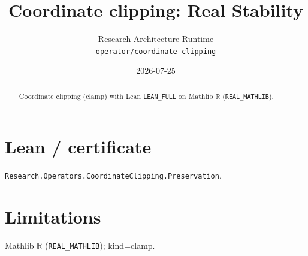 \documentclass[11pt]{article}
\title{Coordinate clipping: Real Stability}
\author{Research Architecture Runtime \\ \texttt{operator/coordinate-clipping}}
\date{2026-07-25}
\begin{document}
\maketitle
\begin{abstract}
Coordinate clipping (clamp) with Lean \texttt{LEAN\_FULL} on Mathlib $\mathbb{R}$ (\texttt{REAL\_MATHLIB}).
\end{abstract}
\section{Lean / certificate}
\texttt{Research.Operators.CoordinateClipping.Preservation}.
\section{Limitations}
Mathlib $\mathbb{R}$ (\texttt{REAL\_MATHLIB}); kind=clamp.
\end{document}
